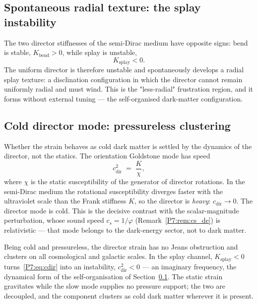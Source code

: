 \documentclass[11pt,a4paper]{article}
\theoremstyle{definition}
\theoremstyle{remark}
\newcommand{\vp}{\varphi}
\begin{document}
\subsection{Spontaneous radial texture: the splay instability}
\label{P7:sec:splay_instability}

The two director stiffnesses of the semi-Dirac medium have opposite
signs: bend is stable, $K_{\mathrm{bend}}>0$, while splay is unstable,
\begin{equation}
  \boxed{K_{\mathrm{splay}}<0.}
\end{equation}
The uniform director is therefore unstable and spontaneously develops a
radial splay texture: a disclination configuration in which the
director cannot remain uniformly radial and must wind.  This is the
"less-radial" frustration region, and it forms without external tuning
--- the self-organised dark-matter configuration.

\subsection{Cold director mode: pressureless clustering}
\label{P7:sec:cold_director}

Whether the strain behaves as cold dark matter is settled by the dynamics
of the director, not the statics.  The orientation Goldstone mode has speed
\begin{equation}
  c_{\mathrm{dir}}^2 \;=\; \frac{K}{\chi},
  \label{P7:eq:cdir}
\end{equation}
where $\chi$ is the static susceptibility of the generator of director
rotations.  In the semi-Dirac medium the rotational susceptibility diverges
faster with the ultraviolet scale than the Frank stiffness $K$, so the
director is \emph{heavy}: $c_{\mathrm{dir}}\to0$.  The director mode is
cold.  This is the decisive contrast with the scalar-magnitude
perturbation, whose sound speed $c_s=1/\vp$ (Remark~\ref{P7:rem:cs_de}) is
relativistic --- that mode belongs to the dark-energy sector, not to dark
matter.

Being cold and pressureless, the director strain has no Jeans obstruction
and clusters on all cosmological and galactic scales.  In the splay
channel, $K_{\mathrm{splay}}<0$ turns~\eqref{P7:eq:cdir} into an
instability, $c_{\mathrm{dir}}^2<0$ --- an imaginary frequency, the
dynamical form of the self-organisation of
Section~\ref{P7:sec:splay_instability}.  The static strain gravitates while
the slow mode supplies no pressure support; the two are decoupled, and the
component clusters as cold dark matter wherever it is present.
\end{document}
